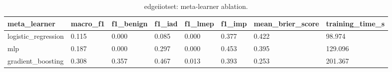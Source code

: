 \begin{table}[t]
\centering
\caption{edgeiiotset: meta-learner ablation.}
\label{tab:edgeiiotset_meta_learner_ablation}
\begin{tabular}{llllllll}
\toprule
meta\_learner & macro\_f1 & f1\_benign & f1\_iad & f1\_lmep & f1\_imp & mean\_brier\_score & training\_time\_s \\
\midrule
logistic\_regression & 0.115 & 0.000 & 0.085 & 0.000 & 0.377 & 0.422 & 98.974 \\
mlp & 0.187 & 0.000 & 0.297 & 0.000 & 0.453 & 0.395 & 129.096 \\
gradient\_boosting & 0.308 & 0.357 & 0.467 & 0.013 & 0.393 & 0.253 & 201.367 \\
\bottomrule
\end{tabular}
\end{table}
